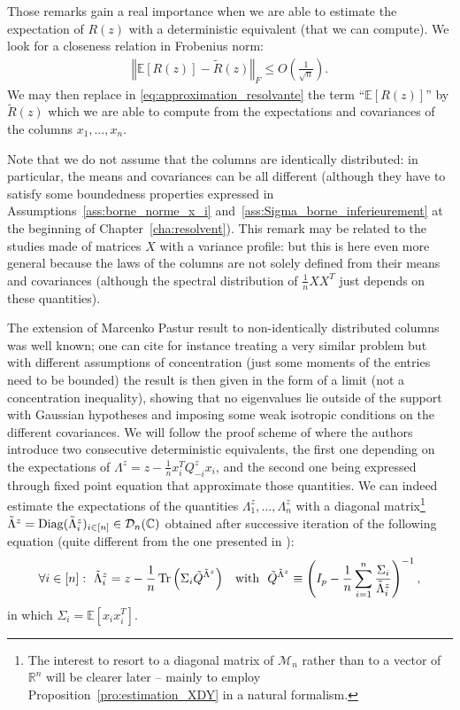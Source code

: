 \documentclass[a4papaer, titlepage]{book}
\begin{document}
Those remarks gain a real importance when we are able to estimate the expectation of $R(z)$ with a deterministic equivalent (that we can compute). We look for a closeness relation in Frobenius norm:
\begin{align*}
   \left\Vert \mathbb E[R(z)] - \tilde R(z)\right\Vert_F\leq O \left(\frac{1}{\sqrt n}\right).
 \end{align*} 
 We may then replace in \eqref{eq:approximation_resolvante} the term ``$\mathbb E[R(z)]$'' by $\tilde R(z)$ which we are able to compute from the expectations and covariances of the columns $x_1,\ldots, x_n$.

Note that we do not assume that the columns are identically distributed: in particular, the means and covariances can be all different (although they have to satisfy some boundedness properties expressed in Assumptions~\ref{ass:borne_norme_x_i} and~\ref{ass:Sigma_borne_inferieurement} at the beginning of Chapter~\ref{cha:resolvent}). This remark may be related to the studies made of matrices $X$ with a variance profile: but this is here even more general because the laws of the columns are not solely defined from their means and covariances (although the spectral distribution of $\frac{1}{n}XX^T$ just depends on these quantities).

The extension of Marcenko Pastur result to non-identically distributed columns was well known; one can cite for instance \cite{hachem2007deterministic,wagner2012large,yin2020singular} treating a very similar problem but with different assumptions of concentration (just some moments of the entries need to be bounded) the result is then given in the form of a limit (not a concentration inequality), \cite{kammoun2016no} showing that no eigenvalues lie outside of the support with Gaussian hypotheses and \cite{dembczak2022empirical} imposing some weak isotropic conditions on the different covariances. 
We will follow the proof scheme of \cite{hachem2007deterministic} where the authors introduce two consecutive deterministic equivalents, the first one depending on the expectations of $\Lambda^z = z - \frac{1}{n}x_i^TQ_{-i}^zx_i$, and the second one being expressed through fixed point equation that approximate those quantities.  
We can indeed estimate the expectations of the quantities $\Lambda^z_1, \ldots, \Lambda^z_n$ with a diagonal matrix\footnote{The interest to resort to a diagonal matrix of $\mathcal M_{n}$ rather than to a vector of $\mathbb R^n$ will be clearer later -- mainly to employ Proposition~\ref{pro:estimation_XDY} in a natural formalism.} $\tilde \Lambda^z = \operatorname{Diag}(\tilde \Lambda_i^z)_{i \in [n]} \in \mathcal D_{n}(\mathbb C)$ obtained after successive iteration of the following equation (quite different from the one presented in \cite{hachem2007deterministic}): 
\begin{align}\label{eq:point_fixe_lambda_intro}
  \forall i\in [n]  : \ 
  \tilde \Lambda^z_i = z  - \frac{1}{n} \tr \left(\Sigma_i \tilde Q^{\tilde \Lambda^z}\right)&
  &\text{with} \ \ \tilde Q^{\tilde \Lambda^z} \equiv \left(I_p - \frac{1}{n} \sum_{i=1}^n \frac{\Sigma_i}{\tilde \Lambda^z_i}\right)^{-1},
\end{align}
in which $\Sigma_i = \mathbb E[x_ix_i^T]$.
\end{document}
